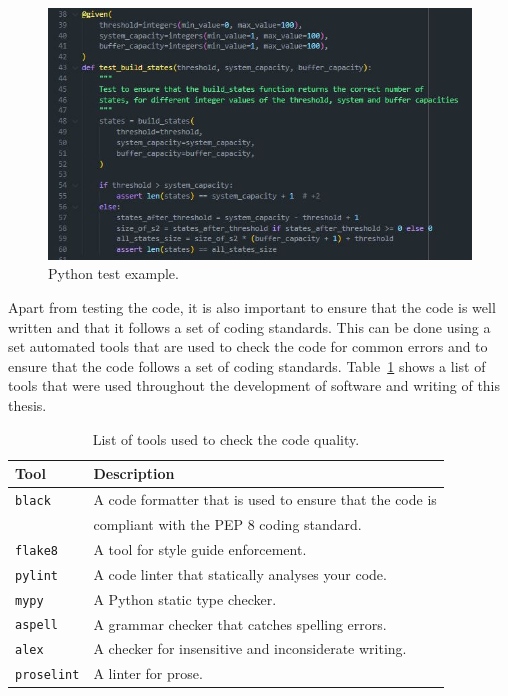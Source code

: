 \begin{figure}[H]
    \includegraphics[width=\linewidth]{chapters/01_introduction/Bin/test_example.JPG}
    \caption{Python test example.}
    \label{fig:test_example}
\end{figure}

Apart from testing the code, it is also important to ensure that the code is
well written and that it follows a set of coding standards.
This can be done using a set automated tools that are used to check the code
for common errors and to ensure that the code follows a set of coding standards.
Table~\ref{tab:code_quality_tools} shows a list of tools that were used
throughout the development of software and writing of this thesis.

\begin{table}[H]
    \centering
    \begin{tabular}{|l|l|}
        \hline
        \textbf{Tool} & \textbf{Description} \\
        \hline
        \texttt{black} & A code formatter that is used to ensure that the code
        is \\ & compliant with the PEP 8 coding standard. \\
        \hline
        \texttt{flake8} & A tool for style guide enforcement. \\
        \hline
        \texttt{pylint} & A code linter that statically analyses your code. \\
        \hline
        \texttt{mypy} & A Python static type checker. \\
        \hline
        \hline
        \texttt{aspell} & A grammar checker that catches spelling errors. \\
        \hline
        \texttt{alex} & A checker for insensitive and inconsiderate writing. \\
        \hline
        \texttt{proselint} & A linter for prose. \\
        \hline
    \end{tabular}
    \caption{List of tools used to check the code quality.}
    \label{tab:code_quality_tools}
\end{table}

